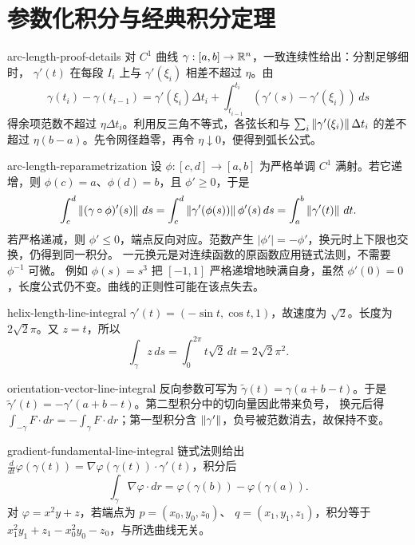 \chapter{参数化积分与经典积分定理}
\label{chap:parametric-classical-integrals-solutions}
\label{chap:parametric-integrals-solutions}
\label{chap:classical-integral-theorems-solutions}

\begin{solution}{arc-length-proof-details}
对 $C^1$ 曲线 $\gamma:[a,b]\to\mathbb{R}^n$，一致连续性给出：分割足够细时，
$\gamma'(t)$ 在每段 $I_i$ 上与 $\gamma'(\xi_i)$ 相差不超过 $\eta$。由
\[
 \gamma(t_i)-\gamma(t_{i-1})
 =\gamma'(\xi_i)\Delta t_i+
   \int_{t_{i-1}}^{t_i}(\gamma'(s)-\gamma'(\xi_i))\,ds
\]
得余项范数不超过 $\eta\Delta t_i$。利用反三角不等式，各弦长和与
$\sum_i\left\lVert\gamma'(\xi_i)\right\rVert\Delta t_i$ 的差不超过
$\eta(b-a)$。先令网径趋零，再令 $\eta\downarrow0$，便得到弧长公式。
\end{solution}

\begin{solution}{arc-length-reparametrization}
设 $\phi:[c,d]\to[a,b]$ 为严格单调 $C^1$ 满射。若它递增，则
$\phi(c)=a$、$\phi(d)=b$，且 $\phi'\ge0$，于是
\[
 \int_c^d\left\lVert(\gamma\circ\phi)'(s)\right\rVert\,ds
 =\int_c^d\left\lVert\gamma'(\phi(s))\right\rVert\phi'(s)\,ds
 =\int_a^b\left\lVert\gamma'(t)\right\rVert\,dt.
\]
若严格递减，则 $\phi'\le0$，端点反向对应。范数产生
$|\phi'|=-\phi'$，换元时上下限也交换，仍得到同一积分。
一元换元是对连续函数的原函数应用链式法则，不需要 $\phi^{-1}$ 可微。
例如 $\phi(s)=s^3$ 把 $[-1,1]$ 严格递增地映满自身，虽然
$\phi'(0)=0$，长度公式仍不变。曲线的正则性可能在该点失去。
\end{solution}

\begin{solution}{helix-length-line-integral}
$\gamma'(t)=(-\sin t,\cos t,1)$，故速度为 $\sqrt2$。长度为
$2\sqrt2\pi$。又 $z=t$，所以
\[
 \int_\gamma z\,ds=\int_0^{2\pi}t\sqrt2\,dt=2\sqrt2\pi^2.
\]
\end{solution}

\begin{solution}{orientation-vector-line-integral}
反向参数可写为 $\widetilde\gamma(t)=\gamma(a+b-t)$。于是
$\widetilde\gamma'(t)=-\gamma'(a+b-t)$。第二型积分中的切向量因此带来负号，
换元后得 $\int_{-\gamma}F\cdot dr=-\int_\gamma F\cdot dr$；第一型积分含
$\left\lVert\gamma'\right\rVert$，负号被范数消去，故保持不变。
\end{solution}

\begin{solution}{gradient-fundamental-line-integral}
链式法则给出
$\frac d{dt}\varphi(\gamma(t))=\nabla\varphi(\gamma(t))\cdot\gamma'(t)$，积分后
\[
 \int_\gamma\nabla\varphi\cdot dr=\varphi(\gamma(b))-\varphi(\gamma(a)).
\]
对 $\varphi=x^2y+z$，若端点为 $p=(x_0,y_0,z_0)$、
$q=(x_1,y_1,z_1)$，积分等于
$x_1^2y_1+z_1-x_0^2y_0-z_0$，与所选曲线无关。
\end{solution}

